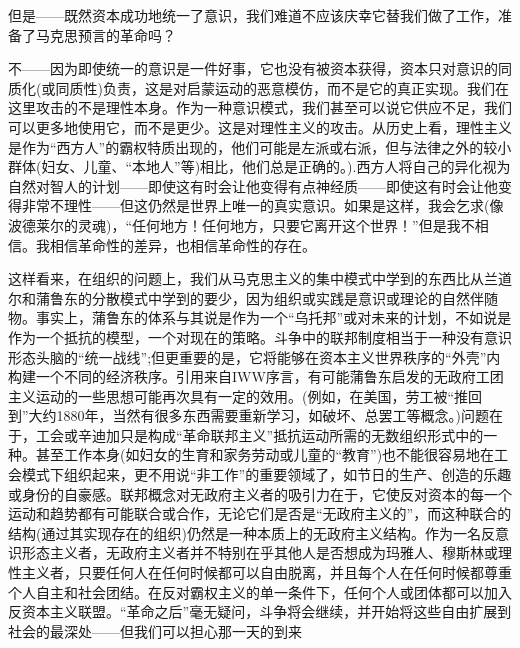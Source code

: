 \documentclass[DIV=12,%
               BCOR=0mm,%
               headinclude=false,%
               footinclude=false,open=any,%
               fontsize=10pt,%
               oneside,%
               paper=210mm:11in]%
               {scrbook}
\begin{document}
但是——既然资本成功地统一了意识，我们难道不应该庆幸它替我们做了工作，准备了马克思预言的革命吗？


不——因为即使统一的意识是一件好事，它也没有被资本获得，资本只对意识的同质化(或同质性)负责，这是对启蒙运动的恶意模仿，而不是它的真正实现。我们在这里攻击的不是理性本身。作为一种意识模式，我们甚至可以说它供应不足，我们可以更多地使用它，而不是更少。这是对理性主义的攻击。从历史上看，理性主义是作为“西方人”的霸权特质出现的，他们可能是左派或右派，但与法律之外的较小群体(妇女、儿童、“本地人”等)相比，他们总是正确的。).西方人将自己的异化视为自然对智人的计划——即使这有时会让他变得有点神经质——即使这有时会让他变得非常不理性——但这仍然是世界上唯一的真实意识。如果是这样，我会乞求(像波德莱尔的灵魂)，“任何地方！任何地方，只要它离开这个世界！”但是我不相信。我相信革命性的差异，也相信革命性的存在。


这样看来，在组织的问题上，我们从马克思主义的集中模式中学到的东西比从兰道尔和蒲鲁东的分散模式中学到的要少，因为组织或实践是意识或理论的自然伴随物。事实上，蒲鲁东的体系与其说是作为一个“乌托邦”或对未来的计划，不如说是作为一个抵抗的模型，一个对现在的策略。斗争中的联邦制度相当于一种没有意识形态头脑的“统一战线”;但更重要的是，它将能够在资本主义世界秩序的“外壳”内构建一个不同的经济秩序。引用来自IWW序言，有可能蒲鲁东启发的无政府工团主义运动的一些思想可能再次具有一定的效用。(例如，在美国，劳工被“推回到”大约1880年，当然有很多东西需要重新学习，如破坏、总罢工等概念。)问题在于，工会或辛迪加只是构成“革命联邦主义”抵抗运动所需的无数组织形式中的一种。甚至工作本身(如妇女的生育和家务劳动或儿童的“教育”)也不能很容易地在工会模式下组织起来，更不用说“非工作”的重要领域了，如节日的生产、创造的乐趣或身份的自豪感。联邦概念对无政府主义者的吸引力在于，它使反对资本的每一个运动和趋势都有可能联合或合作，无论它们是否是“无政府主义的”，而这种联合的结构(通过其实现存在的组织)仍然是一种本质上的无政府主义结构。作为一名反意识形态主义者，无政府主义者并不特别在乎其他人是否想成为玛雅人、穆斯林或理性主义者，只要任何人在任何时候都可以自由脱离，并且每个人在任何时候都尊重个人自主和社会团结。在反对霸权主义的单一条件下，任何个人或团体都可以加入反资本主义联盟。“革命之后”毫无疑问，斗争将会继续，并开始将这些自由扩展到社会的最深处——但我们可以担心那一天的到来
\end{document}
